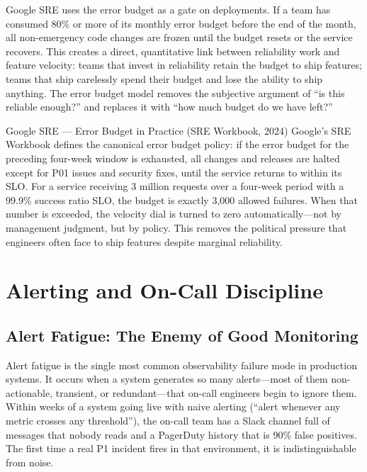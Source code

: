 \documentclass[11pt,a4paper]{article}
\begin{document}
Google SRE uses the error budget as a gate on deployments. If a team has consumed 80\% or more of its monthly error budget before the end of the month, all non-emergency code changes are frozen until the budget resets or the service recovers. This creates a direct, quantitative link between reliability work and feature velocity: teams that invest in reliability retain the budget to ship features; teams that ship carelessly spend their budget and lose the ability to ship anything. The error budget model removes the subjective argument of ``is this reliable enough?'' and replaces it with ``how much budget do we have left?''

\begin{industrybox}{Google SRE --- Error Budget in Practice (SRE Workbook, 2024)}
  Google's SRE Workbook defines the canonical error budget policy: if the error budget for the preceding four-week window is exhausted, all changes and releases are halted except for P01 issues and security fixes, until the service returns to within its SLO. For a service receiving 3 million requests over a four-week period with a 99.9\% success ratio SLO, the budget is exactly 3,000 allowed failures. When that number is exceeded, the velocity dial is turned to zero automatically---not by management judgment, but by policy. This removes the political pressure that engineers often face to ship features despite marginal reliability.
\end{industrybox}

\section{Alerting and On-Call Discipline}

\subsection{Alert Fatigue: The Enemy of Good Monitoring}

Alert fatigue is the single most common observability failure mode in production systems. It occurs when a system generates so many alerts---most of them non-actionable, transient, or redundant---that on-call engineers begin to ignore them. Within weeks of a system going live with naive alerting (``alert whenever any metric crosses any threshold''), the on-call team has a Slack channel full of messages that nobody reads and a PagerDuty history that is 90\% false positives. The first time a real P1 incident fires in that environment, it is indistinguishable from noise.
\end{document}
